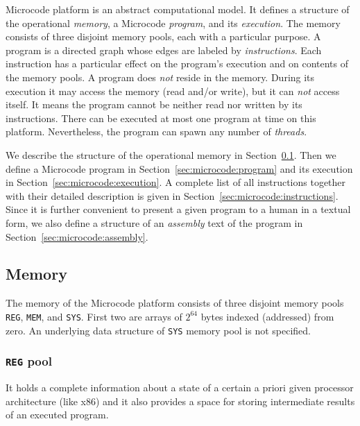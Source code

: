 \documentclass[10pt,twocolumn]{article}
\begin{document}
Microcode platform is an abstract computational model. It defines a structure of
the operational \emph{memory}, a Microcode \emph{program}, and its
\emph{execution}. The memory consists of three disjoint memory pools, each with
a particular purpose. A program is a directed graph whose edges are labeled by
\emph{instructions}. Each instruction has a particular effect on the program's
execution and on contents of the memory pools. A program does \emph{not} reside
in the memory. During its execution it may access the memory (read and/or
write), but it can \emph{not} access itself. It means the program cannot be
neither read nor written by its instructions. There can be executed at most one
program at time on this platform. Nevertheless, the program can spawn any number
of \emph{threads}.

We describe the structure of the operational memory in
Section~\ref{sec:microcode:memory}. Then we define a Microcode program in
Section~\ref{sec:microcode:program} and its execution in
Section~\ref{sec:microcode:execution}. A complete list of all instructions
together with their detailed description is given in
Section~\ref{sec:microcode:instructions}. Since it is further convenient to
present a given program to a human in a textual form, we also define a structure
of an \emph{assembly} text of the program in
Section~\ref{sec:microcode:assembly}.


\subsection{Memory}
\label{sec:microcode:memory}

The memory of the Microcode platform consists of three disjoint memory pools
\texttt{REG}, \texttt{MEM}, and \texttt{SYS}. First two are arrays of $ 2^{64} $
bytes indexed (addressed) from zero. An underlying data structure of
\texttt{SYS} memory pool is not specified.

\subsubsection{\texttt{REG} pool}
\label{sec:microcode:memory:REG}

It holds a complete information about a state of a certain a priori given
processor architecture (like x86) and it also provides a space for storing
intermediate results of an executed program.
\end{document}

